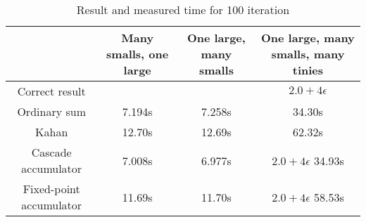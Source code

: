 \documentclass[conference]{IEEEtran}
\begin{document}
\begin{table}[!t]
\renewcommand{\arraystretch}{1.3}
\caption{Result and measured time for 100 iteration}
\label{tab:measurement}
\begin{tabular}{|c|c|c|c|}
\hline
	\parbox[]{2cm}{ \center } & 
	\parbox[]{1.8cm}{ \center Many smalls, one large } & 
	\parbox[]{1.8cm}{ \center One large, many smalls } & 
	\parbox[]{1.8cm}{ \center One large, many smalls, many tinies } \\
\hline
	Correct result &
	\parbox[]{1.8cm}{  \linebreak} &
	\parbox[]{1.8cm}{  \linebreak} &
	\parbox[]{1.8cm}{ \center $2.0 + 4\epsilon$ \linebreak} \\
\hline
	Ordinary sum &
	\parbox[]{1.8cm}{  \linebreak 7.194s \linebreak} &
	\parbox[]{1.8cm}{  \linebreak 7.258s \linebreak} &
	\parbox[]{1.8cm}{  \linebreak 34.30s \linebreak} \\
\hline
	Kahan &
	\parbox[]{1.8cm}{  \linebreak 12.70s \linebreak} &
	\parbox[]{1.8cm}{  \linebreak 12.69s \linebreak} &
	\parbox[]{1.8cm}{  \linebreak 62.32s \linebreak} \\
\hline
	\parbox[]{2.0cm}{ \center Cascade \linebreak accumulator \linebreak} &
	\parbox[]{1.8cm}{  \linebreak 7.008s \linebreak} &
	\parbox[]{1.8cm}{  \linebreak 6.977s \linebreak} &
	\parbox[]{1.8cm}{ \center $2.0 + 4\epsilon$ \linebreak 34.93s \linebreak} \\
\hline
	\parbox[]{2.0cm}{ \center Fixed-point \linebreak accumulator \linebreak} &
	\parbox[]{1.8cm}{  \linebreak 11.69s \linebreak} &
	\parbox[]{1.8cm}{  \linebreak 11.70s \linebreak} &
	\parbox[]{1.8cm}{ \center $2.0 + 4\epsilon$ \linebreak 58.53s \linebreak} \\	
\hline
\end{tabular}
\end{table}
\end{document}
